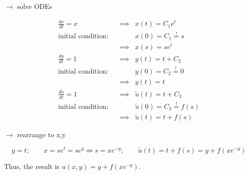 $\to$ solve ODEs

\begin{align*}
 \frac{dx}{dt} = x & &  \implies & x(t) = C_{1}e^t \\
 \text{initial condition:}  & &  & x(0) = C_{1} \stackrel{!}{=} s \\
 &  & \implies & x(s) = se^t \\
\frac{dy}{dt} = 1 &  & \implies  & y(t) = t+C_{2} \\
\text{initial condition:}  &  &  & y(0) = C_{2} \stackrel{!}{=} 0 \\
 &  & \implies & y(t) = t \\
\frac{d\tilde{u}}{dt} = 1 &  & \implies & \tilde{u}(t) = t+C_{3} \\
\text{initial condition:} &  &  & \tilde{u}(0) = C_{3} \stackrel{!}{=} f(s) \\
 &  & \implies & \tilde{u}(t) = t + f(s)
\end{align*}

$\to$ rearrange to x,y

$$
y=t;\quad\quad x=se^t = se^y \iff s=xe^{-y};\quad\quad \tilde{u}(t) = t+f(s) = y + f(xe^{-y})
$$

Thus, the result is $u(x,y) = y + f(xe^{-y})$.
